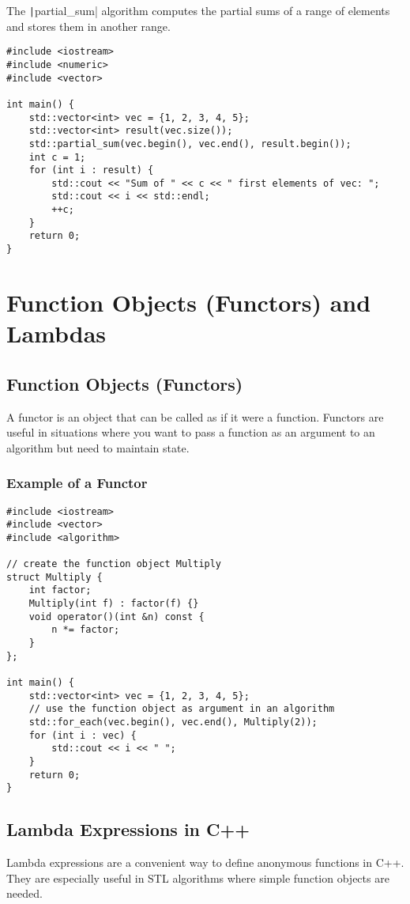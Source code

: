 \documentclass{article}
\begin{document}
The \texttt|partial_sum| algorithm computes the partial sums of a range of elements and stores them in another range.

\begin{verbatim}
#include <iostream>
#include <numeric>
#include <vector>

int main() {
    std::vector<int> vec = {1, 2, 3, 4, 5};
    std::vector<int> result(vec.size());
    std::partial_sum(vec.begin(), vec.end(), result.begin());
    int c = 1;
    for (int i : result) {
    	std::cout << "Sum of " << c << " first elements of vec: ";
        std::cout << i << std::endl;
        ++c;
    }
    return 0;
}
\end{verbatim}

\section{Function Objects (Functors) and Lambdas}

\subsection{Function Objects (Functors)}
A functor is an object that can be called as if it were a function. Functors are useful in situations where you want to pass a function as an argument to an algorithm but need to maintain state.

\subsubsection{Example of a Functor}
\begin{verbatim}
#include <iostream>
#include <vector>
#include <algorithm>

// create the function object Multiply
struct Multiply {
    int factor;
    Multiply(int f) : factor(f) {}
    void operator()(int &n) const {
        n *= factor;
    }
};

int main() {
    std::vector<int> vec = {1, 2, 3, 4, 5};
    // use the function object as argument in an algorithm
    std::for_each(vec.begin(), vec.end(), Multiply(2));
    for (int i : vec) {
        std::cout << i << " ";
    }
    return 0;
}
\end{verbatim}

\subsection{Lambda Expressions in C++}
Lambda expressions are a convenient way to define anonymous functions in C++. They are especially useful in STL algorithms where simple function objects are needed.
\end{document}
